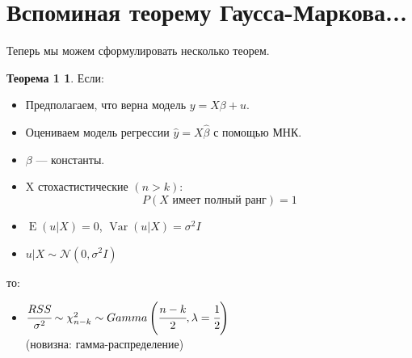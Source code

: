 \documentclass[12pt]{article} %
\theoremstyle{definition} %
\DeclareMathOperator{\Var}{Var}
\DeclareMathOperator{\E}{E}
\def \hb{\hat{\beta}}
\def \hy{\hat{y}}
\def \cN{\mathcal{N}}
\def \cChi{\mathcal{\chi}}
\begin{document}
\section{Вспоминая теорему Гаусса-Маркова...}

Теперь мы можем сформулировать несколько теорем.

\newtheorem*{theo_n}{Теорема 1}
\begin{theo_n}

    Если:
    \begin{itemize}
        \item \text{[ТГМ1] } Предполагаем, что верна модель $y=X\beta+u$.
        \item \text{[ТГМ2] } Оцениваем модель регрессии $\hy = X\hb$ с помощью МНК.
        \item \text{[ТГМ3] } $\beta$ --- константы.
        \item \text{[ТГМ4] } X стохастистические $(n>k)$:
            \[
                P(X \text{ имеет полный ранг}) = 1
            \]
        \item \text{[ТГМ5] } $\E(u|X)=0$, $\Var(u|X)=\sigma^2I$
        \item \text{[нормальность] }  $u|X \sim \cN(0, \sigma^2I)$
    \end{itemize}

    то:
    \begin{itemize}
        \item $\cfrac{RSS}{\sigma^2} \sim \cChi_{n-k}^2 \sim Gamma\left(\cfrac{n-k}{2}, \lambda=\cfrac{1}{2}\right)$ \\
        (новизна: гамма-распределение)
    \end{itemize}

\end{theo_n}
\end{document}
